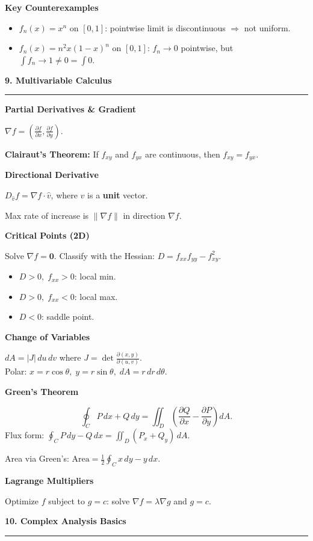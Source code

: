 \documentclass[10pt,twocolumn]{article}
\newcommand{\sect}[1]{\medskip\noindent\textbf{\large #1}\medskip\hrule\smallskip}
\newcommand{\subsect}[1]{\smallskip\noindent\textbf{#1}\par}
\begin{document}
\subsect{Key Counterexamples}
\begin{itemize}[nosep,leftmargin=*]
\item $f_n(x)=x^n$ on $[0,1]$: pointwise limit is discontinuous $\Rightarrow$ not uniform.
\item $f_n(x)=n^2 x(1-x)^n$ on $[0,1]$: $f_n\to 0$ pointwise, but $\int f_n\to 1\neq 0=\int 0$.
\end{itemize}

\sect{9. Multivariable Calculus}

\subsect{Partial Derivatives \& Gradient}
$\nabla f = \left(\frac{\partial f}{\partial x},\frac{\partial f}{\partial y}\right)$.

\textbf{Clairaut's Theorem:} If $f_{xy}$ and $f_{yx}$ are continuous, then $f_{xy}=f_{yx}$.

\subsect{Directional Derivative}
$D_{\hat{v}}f = \nabla f\cdot\hat{v}$, \quad where $\hat{v}$ is a \textbf{unit} vector.

Max rate of increase is $\|\nabla f\|$ in direction $\nabla f$.

\subsect{Critical Points (2D)}
Solve $\nabla f = \mathbf{0}$. Classify with the Hessian:
$D = f_{xx}f_{yy}-f_{xy}^2$.
\begin{itemize}[nosep,leftmargin=*]
\item $D>0,\; f_{xx}>0$: local min.
\item $D>0,\; f_{xx}<0$: local max.
\item $D<0$: saddle point.
\end{itemize}

\subsect{Change of Variables}
$dA = |J|\,du\,dv$ where $J = \det\frac{\partial(x,y)}{\partial(u,v)}$.\\
Polar: $x=r\cos\theta,\; y=r\sin\theta,\; dA=r\,dr\,d\theta$.

\subsect{Green's Theorem}
\[
\oint_C P\,dx+Q\,dy = \iint_D\left(\frac{\partial Q}{\partial x}-\frac{\partial P}{\partial y}\right)dA.
\]
Flux form: $\oint_C P\,dy-Q\,dx = \iint_D (P_x+Q_y)\,dA$.

Area via Green's: $\text{Area}=\frac{1}{2}\oint_C x\,dy-y\,dx$.

\subsect{Lagrange Multipliers}
Optimize $f$ subject to $g=c$: solve $\nabla f=\lambda\nabla g$ and $g=c$.

\sect{10. Complex Analysis Basics}
\end{document}
